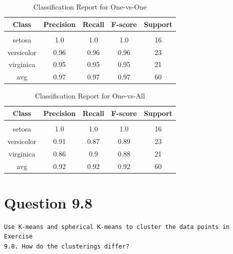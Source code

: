 \documentclass[11pt]{article}
\newenvironment{code}{\captionsetup{type=listing}}{}
\begin{document}
\begin{table}[H]
\centering
\begin{tabular}{c | c c c c}
Class & Precision & Recall & F-score & Support\\
\hline
\hline\\
setosa & 1.0 & 1.0 & 1.0 & 16\\
versicolor & 0.96 & 0.96 & 0.96 & 23\\
virginica & 0.95 & 0.95 & 0.95 & 21\\
avg & 0.97 & 0.97 & 0.97 & 60\\
\end{tabular}
\caption{Classification Report for One-vs-One}
\label{tbl:ovo}
\end{table}
\begin{table}[H]
\centering
\begin{tabular}{c | c c c c}
Class & Precision & Recall & F-score & Support\\
\hline
\hline\\
setosa & 1.0 & 1.0 & 1.0 & 16\\
versicolor & 0.91 & 0.87 & 0.89 & 23\\
virginica & 0.86 & 0.9 & 0.88 & 21\\
avg & 0.92 & 0.92 & 0.92 & 60\\
\end{tabular}
\caption{Classification Report for One-vs-All}
\label{tbl:ova}
\end{table}
\begin{code}
\label{code:q4}
\end{code}
\newpage
\section{Question 9.8} \label{q5}
\begin{verbatim}
Use K-means and spherical K-means to cluster the data points in Exercise
9.8. How do the clusterings differ?
\end{verbatim}
\end{document}
